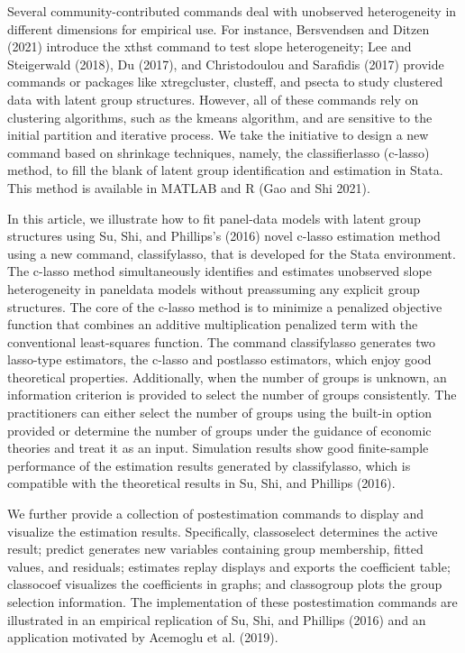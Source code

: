 \documentclass[10pt]{article}
\begin{document}
Several community-contributed commands deal with unobserved heterogeneity in different dimensions for empirical use. For instance, Bersvendsen and Ditzen (2021) introduce the xthst command to test slope heterogeneity; Lee and Steigerwald (2018), Du (2017), and Christodoulou and Sarafidis (2017) provide commands or packages like xtregcluster, clusteff, and psecta to study clustered data with latent group structures. However, all of these commands rely on clustering algorithms, such as the kmeans algorithm, and are sensitive to the initial partition and iterative process. We take the initiative to design a new command based on shrinkage techniques, namely, the classifierlasso (c-lasso) method, to fill the blank of latent group identification and estimation in Stata. This method is available in MATLAB and R (Gao and Shi 2021).

In this article, we illustrate how to fit panel-data models with latent group structures using Su, Shi, and Phillips's (2016) novel c-lasso estimation method using a new command, classifylasso, that is developed for the Stata environment. The c-lasso method simultaneously identifies and estimates unobserved slope heterogeneity in paneldata models without preassuming any explicit group structures. The core of the c-lasso method is to minimize a penalized objective function that combines an additive multiplication penalized term with the conventional least-squares function. The command classifylasso generates two lasso-type estimators, the c-lasso and postlasso estimators, which enjoy good theoretical properties. Additionally, when the number of groups is unknown, an information criterion is provided to select the number of groups consistently. The practitioners can either select the number of groups using the built-in option provided or determine the number of groups under the guidance of economic theories and treat it as an input. Simulation results show good finite-sample performance of the estimation results generated by classifylasso, which is compatible with the theoretical results in Su, Shi, and Phillips (2016).

We further provide a collection of postestimation commands to display and visualize the estimation results. Specifically, classoselect determines the active result; predict generates new variables containing group membership, fitted values, and residuals; estimates replay displays and exports the coefficient table; classocoef visualizes the coefficients in graphs; and classogroup plots the group selection information. The implementation of these postestimation commands are illustrated in an empirical replication of Su, Shi, and Phillips (2016) and an application motivated by Acemoglu et al. (2019).
\end{document}
